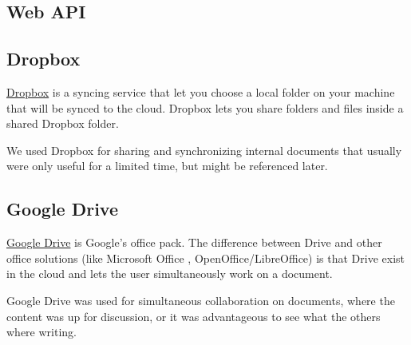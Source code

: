 \documentclass[12pt, a4paper]{article}
\begin{document}
\subsection{Web API}

\subsection{Dropbox}
\href{http://www.dropbox.com}{Dropbox} is a syncing service that let you choose a local folder on your machine that will be synced to the cloud. Dropbox lets you share folders and files inside a shared Dropbox folder.

We used Dropbox for sharing and synchronizing internal documents that usually were only useful for a limited time, but might be referenced later.

\subsection{Google Drive}
\href{https://drive.google.com/}{Google Drive} is Google's office pack. The difference between Drive and other office solutions (like Microsoft Office , OpenOffice/LibreOffice) is that Drive exist in the cloud and lets the user simultaneously work on a document.

Google Drive was used for simultaneous collaboration on documents, where the content was up for discussion, or it was advantageous to see what the others where writing.
\end{document}
